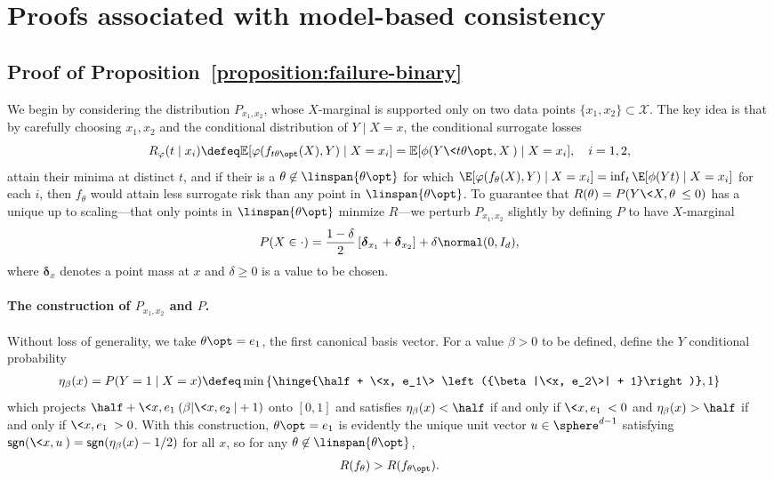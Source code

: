 \documentclass[11pt]{article}
\newcommand{\Ep}{\mathbb{E}}
\newcommand{\prn}[1]{\left({#1}\right)} %
\newcommand{\sgn}{\mathsf{sgn}}  %
\newcommand{\dstr}{P}
\newcommand{\sloss}{\varphi}  %
\begin{document}
\section{Proofs associated with model-based consistency}

\subsection{Proof of Proposition~\ref{proposition:failure-binary}}
\label{proof:failure-binary}

\newcommand{\pointmass}{\boldsymbol{\delta}}

We begin by considering the distribution $\dstr_{x_1, x_2}$, whose
$X$-marginal is supported only on two data points $\{x_1, x_2\} \subset
\mathcal{X}$.
%
The key idea is that by carefully choosing $x_1, x_2$ and the conditional
distribution of $Y \mid X=x$, the conditional surrogate losses
\begin{equation*}
  R_\sloss(t \mid x_i) \defeq
  \Ep [\sloss(f_{t \theta\opt}(X), Y) \mid X = x_i]
  = \Ep[\phi(Y \<t \theta\opt, X\>) \mid X= x_i],
  ~~~ i = 1, 2,
\end{equation*}
attain their minima at distinct $t$, and if their is a $\theta \not \in
\linspan\{\theta\opt\}$ for which $\E[\sloss(f_\theta(X), Y) \mid X = x_i] =
\inf_t \E[\phi(Y t) \mid X = x_i]$ for each $i$, then $f_\theta$ would
attain less surrogate risk than any point in $\linspan\{\theta\opt\}$.
%
To guarantee that $R(\theta) = P(Y\<X, \theta\> \le 0)$ has a unique up to
scaling---that only points in $\linspan\{\theta\opt\}$ minmize $R$---we
perturb
$P_{x_1, x_2}$ slightly by defining $P$ to have $X$-marginal
\begin{equation*}
  P(X \in \cdot) = \frac{1 - \delta}{2}
  \left[\pointmass_{x_1} + \pointmass_{x_2}\right]
  + \delta \normal(0, I_d),
\end{equation*}
where $\pointmass_x$ denotes a point mass at $x$ and $\delta \ge 0$ is a
value to be chosen.

\paragraph{The construction of $P_{x_1,x_2}$ and $P$.}
Without loss of generality, we take $\theta\opt = e_1$, the first
canonical basis vector.
%
For a value $\beta > 0$ to be defined, define the $Y$ conditional
probability
\begin{align*}
  \eta_\beta(x) = P(Y = 1 \mid X = x)
  \defeq \min \left\{\hinge{\half + \<x, e_1\>
  \prn{\beta|\<x, e_2\>| + 1}}, 1\right\}
\end{align*}
which projects $\half + \<x, e_1\>(\beta |\<x, e_2\>| + 1)$ onto $[0, 1]$
and satisfies $\eta_\beta(x) < \half$ if and only if $\<x, e_1\> < 0$ and
$\eta_\beta(x) > \half$ if and only if $\<x, e_1\> > 0$.
%
With this construction, $\theta\opt = e_1$ is evidently the unique unit
vector $u \in \sphere^{d-1}$ satisfying $\sgn(\<x, u\>) = \sgn(\eta_\beta(x)
- 1/2)$ for all $x$, so for any $\theta \not \in \linspan\{\theta\opt\}$,
\begin{align*}
  R(f_{\theta}) > R(f_{\theta\opt}).
\end{align*}
\end{document}
